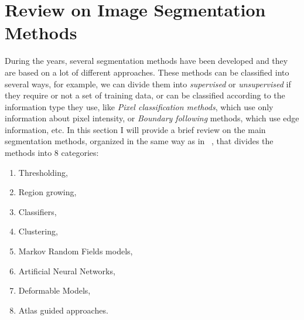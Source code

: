 \documentclass{standalone}
\begin{document}
	
	\section{Review on Image Segmentation Methods}

	During the years, several segmentation methods have been developed and they are based on a lot of different approaches. These methods can be classified into several ways, for example, we can divide them into \emph{supervised} or \emph{unsupervised} if they require or not a set of training data, or can be classified according to the information type they use, like \emph{Pixel classification methods}, which use only information about pixel intensity, or \emph{Boundary following} methods, which use edge information, etc. In this section I will provide a brief review on the main segmentation methods, organized in the same way as in ~\cite{ART:Pham}, that divides the methods into 8 categories: 
		\begin{enumerate}

			\item Thresholding, 

			\item Region growing,

			\item Classifiers,

			\item Clustering,

			\item Markov Random Fields models, 
	
			\item Artificial Neural Networks,

			\item Deformable Models,

			\item Atlas guided approaches.


		\end{enumerate}
	
	
\end{document}
